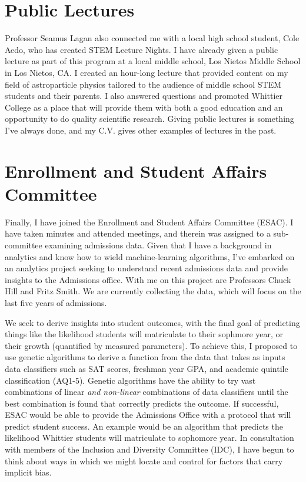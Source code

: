\documentclass[../main.tex]{subfiles}
\begin{document}
\section{Public Lectures}

Professor Seamus Lagan also connected me with a local high school student, Cole Aedo, who has created STEM Lecture Nights.  I have already given a public lecture as part of this program at a local middle school, Los Nietos Middle School in Los Nietos, CA.  I created an hour-long lecture that provided content on my field of astroparticle physics tailored to the audience of middle school STEM students and their parents.  I also answered questions and promoted Whittier College as a place that will provide them with both a good education and an opportunity to do quality scientific research.  Giving public lectures is something I've always done, and my C.V. gives other examples of lectures in the past.

\section{Enrollment and Student Affairs Committee}

Finally, I have joined the Enrollment and Student Affairs Committee (ESAC).  I have taken minutes and attended meetings, and therein was assigned to a sub-committee examining admissions data.  Given that I have a background in analytics and know how to wield machine-learning algorithms, I've embarked on an analytics project seeking to understand recent admissions data and provide insights to the Admissions office.  With me on this project are Professors Chuck Hill and Fritz Smith.  We are currently collecting the data, which will focus on the last five years of admissions.  \\ \hspace{0.1cm}

We seek to derive insights into student outcomes, with the final goal of predicting things like the likelihood students will matriculate to their sophmore year, or their growth (quantified by measured parameters).  To achieve this, I proposed to use genetic algorithms to derive a function from the data that takes as inputs data classifiers such as SAT scores, freshman year GPA, and academic quintile classification (AQ1-5).  Genetic algorithms have the ability to try vast combinations of linear \textit{and non-linear} combinations of data classifiers until the best combination is found that correctly predicts the outcome.  If successful, ESAC would be able to provide the Admissions Office with a protocol that will predict student success.  An example would be an algorithm that predicts the likelihood Whittier students will matriculate to sophomore year.  In consultation with members of the Inclusion and Diversity Committee (IDC), I have begun to think about ways in which we might locate and control for factors that carry implicit bias.
\end{document}

